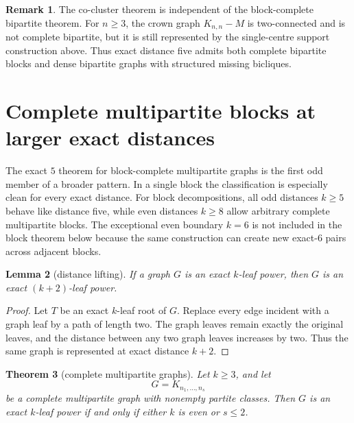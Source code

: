 \documentclass[11pt]{article}
\newtheorem{theorem}{Theorem}[section]
\newtheorem{lemma}[theorem]{Lemma}
\theoremstyle{definition}
\newtheorem{remark}[theorem]{Remark}
\begin{document}
\begin{remark}
The co-cluster theorem is independent of the block-complete bipartite theorem.  For $n\ge3$, the crown graph $K_{n,n}-M$ is two-connected and is not complete bipartite, but it is still represented by the single-centre support construction above.  Thus exact distance five admits both complete bipartite blocks and dense bipartite graphs with structured missing bicliques.
\end{remark}





\section{Complete multipartite blocks at larger exact distances}\label{sec:larger-k-blocks}

The exact $5$ theorem for block-complete multipartite graphs is the first odd member of a broader pattern.  In a single block the classification is especially clean for every exact distance.  For block decompositions, all odd distances $k\ge5$ behave like distance five, while even distances $k\ge8$ allow arbitrary complete multipartite blocks.  The exceptional even boundary $k=6$ is not included in the block theorem below because the same construction can create new exact-$6$ pairs across adjacent blocks.

\begin{lemma}[distance lifting]\label{lem:distance-lifting}
If a graph $G$ is an exact $k$-leaf power, then $G$ is an exact $(k+2)$-leaf power.
\end{lemma}

\begin{proof}
Let $T$ be an exact $k$-leaf root of $G$.  Replace every edge incident with a graph leaf by a path of length two.  The graph leaves remain exactly the original leaves, and the distance between any two graph leaves increases by two.  Thus the same graph is represented at exact distance $k+2$.
\end{proof}

\begin{theorem}[complete multipartite graphs]\label{thm:complete-multipartite-all-k}
Let $k\ge3$, and let
\[
 G=K_{n_1,\ldots,n_s}
\]
be a complete multipartite graph with nonempty partite classes.  Then $G$ is an exact $k$-leaf power if and only if either $k$ is even or $s\le2$.
\end{theorem}
\end{document}
